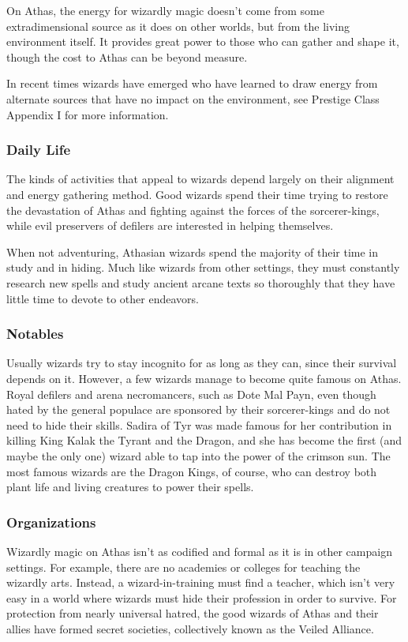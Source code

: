 On Athas, the energy for wizardly magic doesn't come from some extradimensional source as it does on other worlds, but from the living environment itself. It provides great power to those who can gather and shape it, though the cost to Athas can be beyond measure.

In recent times wizards have emerged who have learned to draw energy from alternate sources that have no impact on the environment, see Prestige Class Appendix I for more information.

\subsubsection{Daily Life}
The kinds of activities that appeal to wizards depend largely on their alignment and energy gathering method. Good wizards spend their time trying to restore the devastation of Athas and fighting against the forces of the sorcerer-kings, while evil preservers of defilers are interested in helping themselves.

When not adventuring, Athasian wizards spend the majority of their time in study and in hiding. Much like wizards from other settings, they must constantly research new spells and study ancient arcane texts so thoroughly that they have little time to devote to other endeavors.

\subsubsection{Notables}
Usually wizards try to stay incognito for as long as they can, since their survival depends on it. However, a few wizards manage to become quite famous on Athas. Royal defilers and arena necromancers, such as Dote Mal Payn, even though hated by the general populace are sponsored by their sorcerer-kings and do not need to hide their skills. Sadira of Tyr was made famous for her contribution in killing King Kalak the Tyrant and the Dragon, and she has become the first (and maybe the only one) wizard able to tap into the power of the crimson sun. The most famous wizards are the Dragon Kings, of course, who can destroy both plant life and living creatures to power their spells.

\subsubsection{Organizations}
Wizardly magic on Athas isn't as codified and formal as it is in other campaign settings. For example, there are no academies or colleges for teaching the wizardly arts. Instead, a wizard-in-training must find a teacher, which isn't very easy in a world where wizards must hide their profession in order to survive. For protection from nearly universal hatred, the good wizards of Athas and their allies have formed secret societies, collectively known as the Veiled Alliance.

